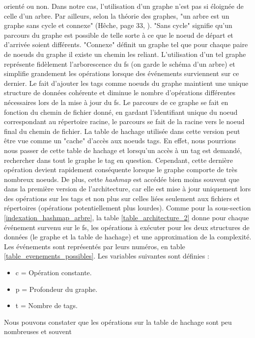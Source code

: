 orienté ou non. Dans notre cas, l'utilisation d'un graphe n'est pas si éloignée de celle d'un arbre. 
Par ailleurs, selon la théorie des graphes, "un arbre est un graphe sans cycle et connexe" (Hêche, 
page 33, \cite{ref28}). "Sans cycle" signifie qu'un parcours du graphe est possible de telle sorte 
à ce que le noeud de départ et d'arrivée soient différents. "Connexe" définit un graphe tel que 
pour chaque paire de noeuds du graphe il existe un chemin les reliant. L'utilisation d'un tel 
graphe représente fidèlement l'arborescence du \acrshort{fs} (on garde le schéma d'un arbre) 
et simplifie grandement les opérations lorsque des événements surviennent sur ce dernier. 
Le fait d'ajouter les tags comme noeuds du graphe 
maintient une unique structure de données cohérente et diminue le nombre d'opérations différentes 
nécessaires lors de la mise à jour du \acrshort{fs}. Le parcours de ce graphe se fait en 
fonction du chemin de fichier donné, en gardant l'identifiant unique du noeud correspondant au 
répertoire racine, le parcours se fait de la racine vers le noeud final du chemin de fichier.
\bigbreak
La table de hachage utilisée dans cette version peut être vue comme un "cache" d'accès aux noeuds 
tags. En effet, nous pourrions nous passer de cette table de hachage et lorsqu'un accès à un tag 
est demandé, rechercher dans tout le graphe le tag en question. Cependant, cette dernière opération 
devient rapidement conséquente lorsque le graphe comporte de très nombreux noeuds. De plus, cette 
\textit{hashmap} est accédée bien moins souvent que dans la première version de l'architecture, 
car elle est mise à jour uniquement lors des opérations sur les tags et non plus sur celles liées 
seulement aux fichiers et répertoires (opérations potentiellement plus lourdes).
\bigbreak
Comme pour la sous-section \ref{indexation_hashmap_arbre}, la table \ref{table_architecture_2} 
donne pour chaque événement survenu sur le \acrshort{fs}, les opérations 
à exécuter pour les deux structures de données (le graphe et la table de hachage) et une approximation 
de la complexité. Les événements sont représentés par leurs numéros, en table 
\ref{table_evenements_possibles}. Les variables suivantes sont définies :
\begin{itemize}
    \item c = Opération constante.
    \item p = Profondeur du graphe.
    \item t = Nombre de tags.
\end{itemize}
Nous pouvons constater que les opérations sur la table de hachage sont peu nombreuses et souvent 
